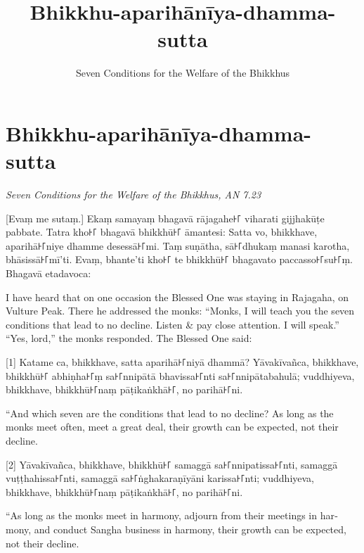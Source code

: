 \documentclass[
  babelLanguage=portuguese,
  final,
  a4Paper,
]{chantingbook}
\title{Bhikkhu-aparihānīya-dhamma-sutta}
\subtitle{Seven Conditions for the Welfare of the Bhikkhus}
\begin{document}
\mainmatter

\eveningChapterSettings

\pagestyle{empty}

\chapter{Bhikkhu-aparihānīya-dhamma-sutta}

\emph{Seven Conditions for the Welfare of the Bhikkhus, AN 7.23}

\begin{leader}
\end{leader}

[Evaṃ me sutaṃ.] Ekaṃ samayaṃ bhagavā rājagahe꜔꜒ viharati gijjhakūṭe pabbate.
Tatra kho꜔꜒ bhagavā bhikkhū꜔꜒ āmantesi: Satta vo, bhikkhave, aparihā꜔꜒niye dhamme
desessā꜔꜒mi. Taṃ suṇātha, sā꜔꜒dhukaṃ manasi karotha, bhāsissā꜔꜒mī'ti. Evaṃ, bhante'ti
kho꜔꜒ te bhikkhū꜔꜒ bhagavato paccasso꜔꜒su꜔꜒ṃ. Bhagavā etadavoca:

\begin{english}
  I have heard that on one occasion the Blessed One was staying in Rajagaha, on
  Vulture Peak. There he addressed the monks: “Monks, I will teach you the seven
  conditions that lead to no decline. Listen \& pay close attention. I will
  speak.” “Yes, lord,” the monks responded. The Blessed One said:
\end{english}

[1] Katame ca, bhikkhave, satta aparihā꜔꜒niyā dhammā? Yāvakīvañca, bhikkhave, bhikkhū꜔꜒
abhiṇha꜔꜒ṃ sa꜔꜒nnipātā bhavissa꜔꜒nti sa꜔꜒nnipātabahulā; vuddhiyeva, bhikkhave,
bhikkhū꜔꜒naṃ pāṭikaṅkhā꜔꜒, no parihā꜔꜒ni.

\begin{english}
  “And which seven are the conditions that lead to no decline? As long as the
  monks meet often, meet a great deal, their growth can be expected, not their
  decline.
\end{english}

[2] Yāvakīvañca, bhikkhave, bhikkhū꜔꜒ samaggā sa꜔꜒nnipatissa꜔꜒nti, samaggā
vuṭṭhahissa꜔꜒nti, samaggā sa꜔꜒ṅghakaraṇīyāni karissa꜔꜒nti; vuddhiyeva, bhikkhave,
bhikkhū꜔꜒naṃ pāṭikaṅkhā꜔꜒, no parihā꜔꜒ni.

\begin{english}
  “As long as the monks meet in harmony, adjourn from their meetings in harmony,
  and conduct Sangha business in harmony, their growth can be expected, not
  their decline.
\end{english}
\end{document}
